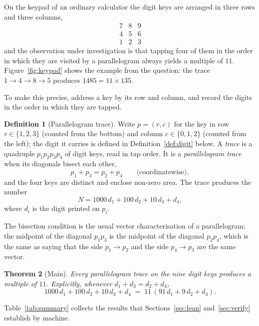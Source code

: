 \documentclass[11pt,a4paper]{article}
\newtheorem{theorem}{Theorem}
\theoremstyle{definition}
\newtheorem{definition}[theorem]{Definition}
\theoremstyle{remark}
\begin{document}
On the keypad of an ordinary calculator the digit keys are arranged in three rows
and three columns,
\[
\begin{array}{ccc}
7&8&9\\
4&5&6\\
1&2&3
\end{array}
\]
and the observation under investigation is that tapping four of them in the order
in which they are visited by a parallelogram always yields a multiple of $11$.
Figure~\ref{fig:keypad} shows the example from the question: the trace
$1\to4\to8\to5$ produces $1485=11\times 135$.

To make this precise, address a key by its row and column, and record the digits in
the order in which they are tapped.

\begin{definition}[Parallelogram trace]
\label{def:trace}
Write $p=(r,c)$ for the key in row $r\in\{1,2,3\}$ (counted from the bottom) and
column $c\in\{0,1,2\}$ (counted from the left); the digit it carries is defined in
Definition~\ref{def:digit} below. A \emph{trace} is a quadruple $p_1p_2p_3p_4$ of
digit keys, read in tap order. It is a \emph{parallelogram trace} when its diagonals
bisect each other,
\[
p_1+p_3=p_2+p_4\qquad\text{(coordinatewise)},
\]
and the four keys are distinct and enclose non-zero area. The trace produces the
number
\[
N=1000\,d_1+100\,d_2+10\,d_3+d_4,
\]
where $d_i$ is the digit printed on $p_i$.
\end{definition}

The bisection condition is the usual vector characterisation of a parallelogram: the
midpoint of the diagonal $p_1p_3$ is the midpoint of the diagonal $p_2p_4$, which is
the same as saying that the side $p_1\to p_2$ and the side $p_4\to p_3$ are the same
vector.

\begin{theorem}[Main]
\label{thm:main}
Every parallelogram trace on the nine digit keys produces a multiple of $11$.
Explicitly, whenever $d_1+d_3=d_2+d_4$,
\[
1000\,d_1+100\,d_2+10\,d_3+d_4 \;=\; 11\,(91\,d_1+9\,d_2+d_3).
\]
\end{theorem}

Table~\ref{tab:summary} collects the results that Sections~\ref{sec:lean}
and~\ref{sec:verify} establish by machine.
\end{document}
